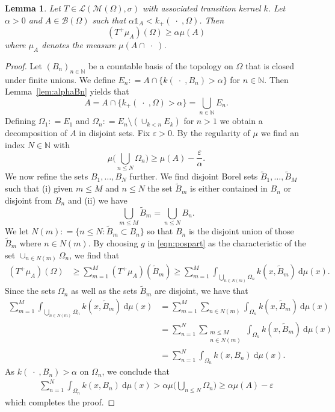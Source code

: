 \documentclass{amsart}
\numberwithin{equation}{section}
\newtheorem{lem}[thm]{Lemma}
\theoremstyle{remark}
\theoremstyle{definition}
\begin{document}
\begin{lem}
\label{lem:keylemma}
	Let $T\in\mathscr{L}(\mathscr{M}(\Omega),\sigma)$ with associated transition kernel $k$.
	Let $\alpha>0$ and $A\in \mathscr{B}(\Omega)$ such that $\alpha \mathds{1}_A < k_+(\;\cdot\;,\Omega)$. Then
	\[ (T^+\mu_A)(\Omega) \geq \alpha \mu(A) \]
	where $\mu_A$ denotes the measure $\mu(A\cap \;\cdot\;)$.
\end{lem}
\begin{proof}
	Let $(B_n)_{n\in{\mathds{N}}}$ be a countable basis of the topology on $\Omega$ that is closed under finite unions.
	We define $E_n {\mathrel{\mathop:}=} A \cap \{ k(\;\cdot\;, B_n)>\alpha\}$ for $n\in{\mathds{N}}$. Then Lemma~\ref{lem:alphaBn} yields that
	\[ A = A\cap \{ k_+( \;\cdot\;,\Omega)>\alpha\} = \bigcup_{n\in{\mathds{N}}} E_n.\]
	Defining $\Omega_1 {\mathrel{\mathop:}=} E_1$ and $\Omega_n {\mathrel{\mathop:}=} E_n \setminus (\cup_{k<n} E_k)$ for $n>1$ we obtain a 
	decomposition of $A$ in disjoint sets.
	Fix ${\varepsilon}>0$.
	By the regularity of $\mu$ we find an index $N\in{\mathds{N}}$ with
	\[ \mu\biggl(\bigcup_{n\leq N} \Omega_n \biggr) \geq \mu(A)-\frac{\varepsilon}{\alpha}.\]
	We now refine the sets $B_1, \ldots, B_N$ further. We find disjoint Borel sets $\tilde B_1, \ldots, \tilde B_M$ such that
	(i) given $m\leq M$ and $n\leq N$ the set $\tilde B_m$ is either contained in $B_n$ or disjoint from $B_n$
	and (ii) we have
	\[\bigcup_{m\leq M} \tilde B_m = \bigcup_{n\leq N} B_n .\]
	We let $N(m) {\mathrel{\mathop:}=} \{ n\leq N  : \tilde B_m \subset B_n\}$ 
	so that $B_n$ is the disjoint union of those $\tilde B_m$ where $n\in N(m)$. 
	By choosing $g$ in \eqref{eqn:pospart} as the characteristic of the set $\cup_{n\in N(m)} \Omega_n$, we find that
	\begin{align*}
	(T^+\mu_A)(\Omega) &\geq \sum_{m=1}^M (T^+\mu_A)(\tilde B_m)
	\geq \sum_{m=1}^M \int_{\bigcup_{n\in N(m)} \Omega_n} k(x,\tilde B_m) {\:\mathrm{d}}\mu(x).
	\end{align*}
	Since the sets $\Omega_n$ as well as the sets $\tilde B_m$ are disjoint, we have that
	\begin{align*}
	\sum_{m=1}^M \int_{\bigcup_{n\in N(m)} \Omega_n} k(x,\tilde B_m) {\:\mathrm{d}}\mu(x)
	&=\sum_{m=1}^M \sum_{n\in N(m)} \int_{\Omega_n} k(x,\tilde B_m) {\:\mathrm{d}}\mu(x)\\
	&= \sum_{n=1}^N \sum_{\substack{m\leq M\\n\in N(m)}} \int_{\Omega_n} k(x,\tilde B_m) {\:\mathrm{d}}\mu(x)\\
	&= \sum_{n=1}^N \int_{\Omega_n} k(x,B_n) {\:\mathrm{d}}\mu(x).
	\end{align*}
	As $k(\;\cdot\;,B_n) > \alpha$ on $\Omega_n$, we conclude that
	\begin{align*}
	\sum_{n=1}^N \int_{\Omega_n} k(x,B_n) {\:\mathrm{d}}\mu(x) > \alpha \mu\biggl(\bigcup_{n\leq N} \Omega_n \biggr) \geq \alpha \mu(A) - {\varepsilon}
	\end{align*}
	which completes the proof.
\end{proof}
\end{document}
